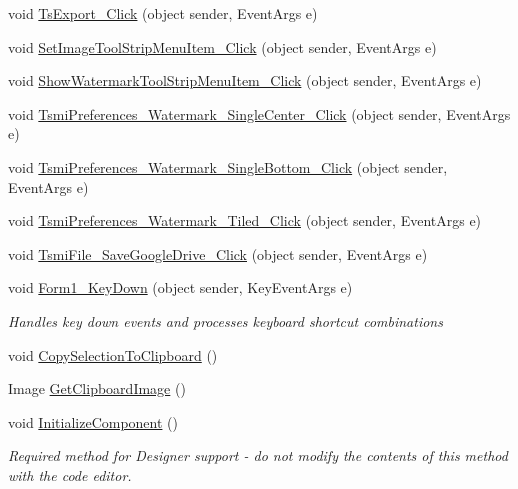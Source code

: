 \begin{DoxyCompactItemize}
\item 
void \mbox{\hyperlink{class_paint___program_1_1_form1_a029f8130f202c343547662281dd3b579}{Ts\+Export\+\_\+\+Click}} (object sender, Event\+Args e)
\item 
void \mbox{\hyperlink{class_paint___program_1_1_form1_a5a68e92cce596c404c124632a816f1a8}{Set\+Image\+Tool\+Strip\+Menu\+Item\+\_\+\+Click}} (object sender, Event\+Args e)
\item 
void \mbox{\hyperlink{class_paint___program_1_1_form1_aef82c4e95b5665684979ac3a80ab9d1b}{Show\+Watermark\+Tool\+Strip\+Menu\+Item\+\_\+\+Click}} (object sender, Event\+Args e)
\item 
void \mbox{\hyperlink{class_paint___program_1_1_form1_ab63c1cf093277a8090c5320d01ac15a4}{Tsmi\+Preferences\+\_\+\+Watermark\+\_\+\+Single\+Center\+\_\+\+Click}} (object sender, Event\+Args e)
\item 
void \mbox{\hyperlink{class_paint___program_1_1_form1_a865d2bb002b7ee82f9c395577b1b3d0c}{Tsmi\+Preferences\+\_\+\+Watermark\+\_\+\+Single\+Bottom\+\_\+\+Click}} (object sender, Event\+Args e)
\item 
void \mbox{\hyperlink{class_paint___program_1_1_form1_a45bd276e52f9e8bf269c504c8ec618a6}{Tsmi\+Preferences\+\_\+\+Watermark\+\_\+\+Tiled\+\_\+\+Click}} (object sender, Event\+Args e)
\item 
void \mbox{\hyperlink{class_paint___program_1_1_form1_aa5747a15abf1a595a61fea3cad264b64}{Tsmi\+File\+\_\+\+Save\+Google\+Drive\+\_\+\+Click}} (object sender, Event\+Args e)
\item 
void \mbox{\hyperlink{class_paint___program_1_1_form1_aad3ab339698773a2374c8d7010435ed9}{Form1\+\_\+\+Key\+Down}} (object sender, Key\+Event\+Args e)
\begin{DoxyCompactList}\small\item\em Handles key down events and processes keyboard shortcut combinations ~\newline
 \end{DoxyCompactList}\item 
void \mbox{\hyperlink{class_paint___program_1_1_form1_adc345c6a01064caac3ad12472221150c}{Copy\+Selection\+To\+Clipboard}} ()
\item 
Image \mbox{\hyperlink{class_paint___program_1_1_form1_a46dce5128798bdc15d8fade229630ec0}{Get\+Clipboard\+Image}} ()
\item 
void \mbox{\hyperlink{class_paint___program_1_1_form1_a0c2c0648cdef32547fed28e522cf0cbe}{Initialize\+Component}} ()
\begin{DoxyCompactList}\small\item\em Required method for Designer support -\/ do not modify the contents of this method with the code editor. \end{DoxyCompactList}\end{DoxyCompactItemize}
